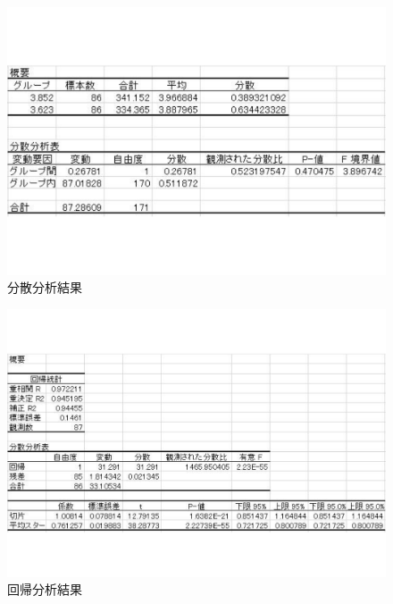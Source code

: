 \begin{figure}[htbp]

\centering
\includegraphics[width=12cm,clip]{reviewtoukei.pdf}
\caption{分散分析結果}
\label{reviewtoukei}

\end{figure}

\begin{figure}[htbp]

\centering
\includegraphics[width=12cm,clip]{reviewtoukei2.pdf}
\caption{回帰分析結果}
\label{reviewtoukei2}

\end{figure}


\clearpage

